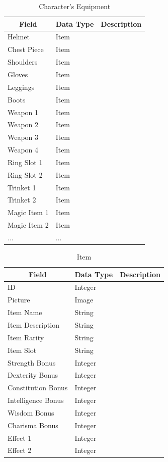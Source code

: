 \documentclass[12pt,letterpaper]{article}
\begin{document}
	\begin{table}[h]
		\centering
		\begin{tabular}{| l | l | p{7cm} |}
			\hline
			\multicolumn{1}{|c|}{\bf{Field}} & \multicolumn{1}{|c|}{\bf{Data Type}} & \multicolumn{1}{|c|}{\bf{Description}}\\ \hline
			Helmet & Item & \\ \hline
			Chest Piece & Item & \\ \hline
			Shoulders & Item & \\ \hline
			Gloves & Item & \\ \hline
			Leggings & Item & \\ \hline
			Boots & Item & \\ \hline
			Weapon 1 & Item & \\ \hline
			Weapon 2 & Item & \\ \hline
			Weapon 3 & Item & \\ \hline
			Weapon 4 & Item & \\ \hline
			Ring Slot 1 & Item & \\ \hline
			Ring Slot 2 & Item & \\ \hline
			Trinket 1 & Item & \\ \hline
			Trinket 2 & Item & \\ \hline
			Magic Item 1 & Item & \\ \hline
			Magic Item 2 & Item & \\ \hline
			... & ... & \\ \hline
		\end{tabular}
		\caption{Character's Equipment}
		\label{tab:tableCharacterEquipment}
	\end{table}			

	\begin{table}[h]
		\begin{tabular}{| l | l | p{7cm} |}
			\hline
			\multicolumn{1}{|c|}{\bf{Field}} & \multicolumn{1}{|c|}{\bf{Data Type}} & \multicolumn{1}{|c|}{\bf{Description}}\\ \hline
			ID & Integer & \\ \hline
			Picture & Image & \\ \hline
			Item Name & String & \\ \hline
			Item Description & String & \\ \hline
			Item Rarity & String & \\ \hline
			Item Slot & String & \\ \hline
			Strength Bonus & Integer & \\ \hline
			Dexterity Bonus & Integer & \\ \hline
			Constitution Bonus & Integer & \\ \hline
			Intelligence Bonus & Integer & \\ \hline
			Wisdom Bonus & Integer & \\ \hline
			Charisma Bonus & Integer & \\ \hline
			Effect 1 & Integer & \\ \hline
			Effect 2 & Integer & \\ \hline
			
		\end{tabular}
		\caption{Item}	
		\label{tab:tableItem}
	\end{table}
\end{document}
